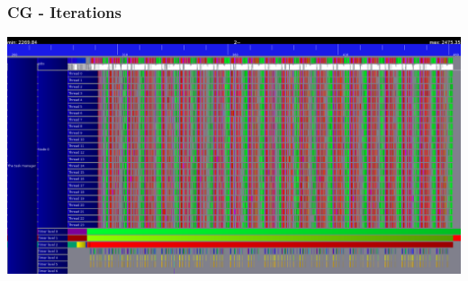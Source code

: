 \documentclass{beamer}
\begin{document}
\begin{frame}
\frametitle{CG - Iterations}
\includegraphics[width=1\linewidth]{iterations_trace.png}
\end{frame}
\end{document}
